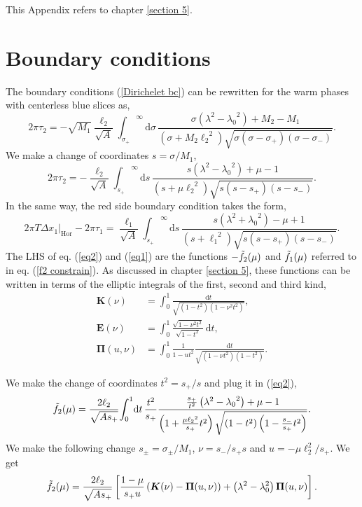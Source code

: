This Appendix refers to chapter \ref{section 5}.

\section{Boundary conditions}

The boundary conditions (\ref{Dirichelet bc}) can be rewritten for the warm phases with centerless blue slices as,
\begin{equation}
    2\pi\tau_2 = -\sqrt{M_1}\frac{\ell_2}{\sqrt{A}} {\int_{\sigma_+}}^\infty \text{d}\sigma\, \frac{\sigma\left(\lambda^2-{\lambda_0}^2\right)+M_2-M_1}{\left(\sigma+M_2{\ell_2}^2\right)\sqrt{\sigma\left(\sigma-\sigma_+\right)\left(\sigma-\sigma_-\right)}}.
\end{equation}
We make a change of coordinates $s = \sigma/M_1$,
\begin{equation}\label{eq2}
    2\pi\tau_2 = -\frac{\ell_2}{\sqrt{A}} {\int_{s_+}}^\infty \text{d}s\, \frac{s\left(\lambda^2-{\lambda_0}^2\right)+\mu-1}{\left(s+\mu{\ell_2}^2\right)\sqrt{s\left(s-s_+\right)\left(s-s_-\right)}}.
\end{equation}
In the same way, the red side boundary condition takes the form,
\begin{equation}\label{eq1}
    2\pi T\Delta x_1\big|_\text{Hor}-2\pi\tau_1 = \frac{\ell_1}{\sqrt{A}} {\int_{s_+}}^\infty \text{d}s\, \frac{s\left(\lambda^2+{\lambda_0}^2\right)-\mu+1}{\left(s+{\ell_1}^2\right)\sqrt{s\left(s-s_+\right)\left(s-s_-\right)}}.
\end{equation}
The LHS of eq. (\ref{eq2}) and (\ref{eq1}) are the functions $-\Tilde{f}_2(\mu)$ and $\Tilde{f}_1(\mu)$ referred to in eq. (\ref{f2 constrain}). As discussed in chapter \ref{section 5}, these functions can be written in terms of the elliptic integrals of the first, second and third kind,
\begin{align}
    \bm{K}(\nu) &= \int_{0}^{1} \frac{\mathrm{d}t}{\sqrt{\left(1 - t^2\right)\left(1 - \nu^2 t^2\right)}},\\
    \bm{E}(\nu) &= \int_0^1 \frac{\sqrt{1-\nu^2 t^2} }{\sqrt{1-t^2}}\,\mathrm{d}t,\\
    \bm{\Pi}(u,\nu) &= \int_{0}^{1} \frac{1}{1-ut^2} \frac{\mathrm{d}t}{\sqrt{\left(1-\nu t^2\right)\left(1-t^2\right)}}.
\end{align}

We make the change of coordinates $t^2=s_+/s$ and plug it in (\ref{eq2}),
\begin{equation}\label{eq22}
    \Tilde{f}_2(\mu) = \frac{2\ell_2}{\sqrt{As_+}} {\int_{0}}^1 \text{d}t\,\frac{t^2}{s_+} \frac{\frac{s_+}{t^2}\left(\lambda^2-{\lambda_0}^2\right)+\mu-1}{\left(1+\frac{\mu{\ell_2}^2}{s_+}t^2\right)\sqrt{\left(1-t^2\right)\left(1-\frac{s_-}{s_+}t^2\right)}}.
\end{equation}
We make the following change $s_\pm=\sigma_\pm/M_1$, $\nu=s_-/s_+s$ and $u=-\mu\ell_2^2/s_+$. We get
\begin{equation}
    \Tilde{f}_2(\mu) = \frac{2\ell_2}{\sqrt{As_+}}\left[\frac{1-\mu}{s_+ u}\left(\bm{K}(\nu)-\bm{\Pi}(u,\nu)\right)+\left(\lambda^2-\lambda_0^2\right)\bm{\Pi}(u,\nu)\right].
\end{equation}
